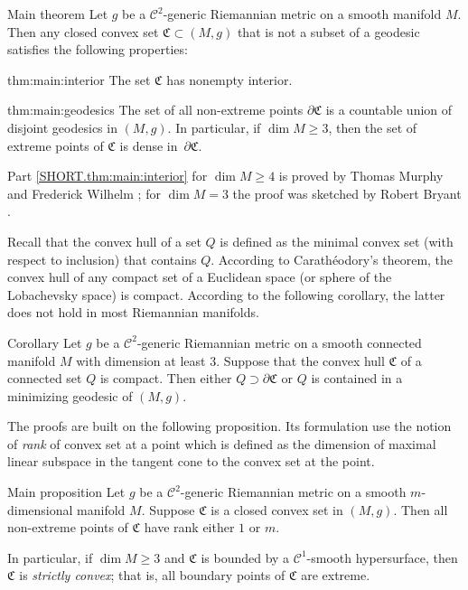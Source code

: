 \documentclass[a4paper,10pt]{article}
\begin{document}
\begin{thm}{Main theorem}\label{thm:main}
Let $g$ be a $\mathcal C^2$-generic Riemannian metric on a smooth manifold $M$.
Then any closed convex set $\mathfrak{C}\subset (M,g)$ that is not a subset of a geodesic
satisfies the following properties:

\begin{subthm}{thm:main:interior}
The set $\mathfrak{C}$ has nonempty interior.
\end{subthm}

\begin{subthm}{thm:main:geodesics}
The set of all non-extreme points $\partial\mathfrak{C}$ is a countable union of disjoint geodesics in $(M,g)$.
In particular, if $\dim M\ge 3$, then the set of
extreme points of $\mathfrak{C}$ is dense in~$\partial\mathfrak{C}$.
\end{subthm}

\end{thm}

Part \ref{SHORT.thm:main:interior} for $\dim M\ge 4$ is proved by Thomas Murphy and Frederick Wilhelm \cite{Wilhelm};
for $\dim M=3$ the proof was sketched by Robert Bryant \cite{Bryant}.

Recall that the convex hull of a set $Q$ is defined as the minimal convex set (with respect to inclusion) that contains $Q$.
According to Carathéodory's theorem, the convex hull of  any compact set of a Euclidean space (or sphere of the Lobachevsky space) is compact.
According to the following corollary, the latter does not hold in most Riemannian manifolds.

\begin{thm}{Corollary}\label{cor:caratheodory}
Let $g$ be a $\mathcal C^2$-generic Riemannian metric on a smooth connected manifold $M$ with dimension at least 3.
Suppose that the convex hull $\mathfrak{C}$ of a connected set $Q$ is compact.
Then either $Q\supset \partial \mathfrak{C}$ or $Q$ is contained in a minimizing geodesic of $(M,g)$.
\end{thm}

The proofs are built on the following proposition.
Its formulation use the notion of \emph{rank} of convex set at a point which is defined as the dimension of maximal linear subspace in the tangent cone to the convex set at the point.

\begin{thm}{Main proposition}\label{prom:rank}
Let $g$ be a $\mathcal C^2$-generic Riemannian metric on a smooth $m$-dimensional manifold $M$.
Suppose $\mathfrak{C}$ is a closed convex set in $(M,g)$.
Then all non-extreme points of $\mathfrak{C}$ have rank either $1$ or $m$.

In particular, if $\dim M\ge 3$ and $\mathfrak{C}$ is bounded by a $\mathcal{C}^1$-smooth hypersurface, then $\mathfrak{C}$ is \emph{strictly convex};
that is, all boundary points of $\mathfrak{C}$ are extreme.
\end{thm}
\end{document}
